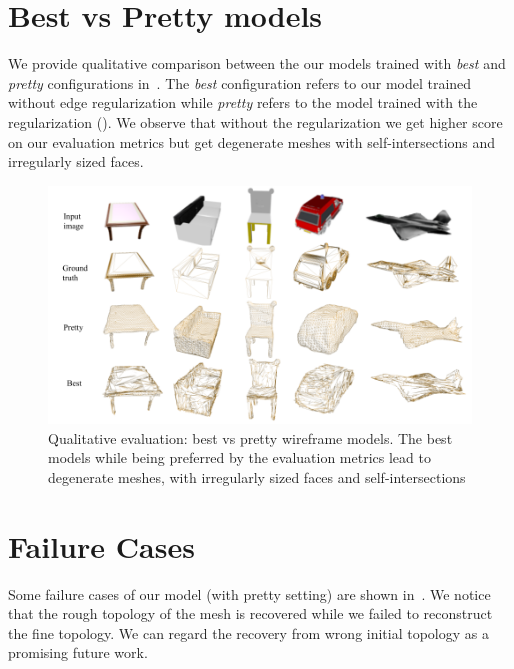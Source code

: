 \section*{Best vs Pretty models}

We provide qualitative comparison between the our models trained with \emph{best} and \emph{pretty} configurations in~.
The \emph{best} configuration refers to our model trained without edge regularization while \emph{pretty} refers to the model trained with the regularization ().
We observe that without the regularization we get higher score on our evaluation metrics but get degenerate meshes with self-intersections and irregularly sized faces.

\begin{figure}[h]
    \begin{center}
        \includegraphics[width=\linewidth]{imgs/best_vs_pretty.png}
    \end{center}
    \vspace{-4mm}
        \caption{Qualitative evaluation: best vs pretty wireframe models. The best models while being preferred by the evaluation metrics lead to degenerate meshes, with irregularly sized faces and self-intersections}
        \vspace{-4mm}
        \label{fig:best_vs_pretty}
\end{figure}

\newpage
\section*{Failure Cases}

Some failure cases of our model (with pretty setting) are shown in~.
We notice that the rough topology of the mesh is recovered while we failed to reconstruct the fine topology.
We can regard the recovery from wrong initial topology as a promising future work.

